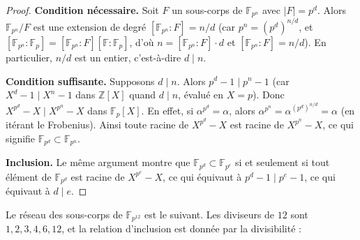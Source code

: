 \documentclass[12pt,a4paper,openany]{book}
\theoremstyle{definition}
\newcommand{\Z}{\mathbb{Z}}
\newcommand{\F}{\mathbb{F}}
\begin{document}
\begin{proof}
\textbf{Condition nécessaire.} Soit $F$ un sous-corps de $\F_{p^n}$ avec
$|F| = p^d$. Alors $\F_{p^n}/F$ est une extension de degré
$[\F_{p^n}:F] = n/d$ (car $p^n = (p^d)^{n/d}$, et $[\F_{p^n}:\F_p] =
[\F_{p^n}:F][\F:\F_p]$, d'où $n = [\F_{p^n}:F] \cdot d$ et $[\F_{p^n}:F] =
n/d$). En particulier, $n/d$ est un entier, c'est-à-dire $d \mid n$.

\textbf{Condition suffisante.} Supposons $d \mid n$. Alors $p^d - 1 \mid p^n - 1$
(car $X^d - 1 \mid X^n - 1$ dans $\Z[X]$ quand $d \mid n$, évalué en $X = p$).
Donc $X^{p^d} - X \mid X^{p^n} - X$ dans $\F_p[X]$. En effet, si
$\alpha^{p^d} = \alpha$, alors
$\alpha^{p^n} = \alpha^{(p^d)^{n/d}} = \alpha$ (en itérant le Frobenius).
Ainsi toute racine de $X^{p^d} - X$ est racine de $X^{p^n} - X$, ce qui
signifie $\F_{p^d} \subset \F_{p^n}$.

\textbf{Inclusion.} Le même argument montre que $\F_{p^d} \subset \F_{p^e}$ si et
seulement si tout élément de $\F_{p^d}$ est racine de $X^{p^e} - X$, ce qui
équivaut à $p^d - 1 \mid p^e - 1$, ce qui équivaut à $d \mid e$.
\end{proof}

\begin{center}
\end{center}

\vspace{-1cm}
Le réseau des sous-corps de $\F_{p^{12}}$ est le suivant. Les diviseurs de $12$
sont $1, 2, 3, 4, 6, 12$, et la relation d'inclusion est donnée par la
divisibilité :

\begin{center}
\end{center}
\end{document}
